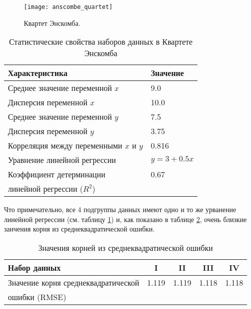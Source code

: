     \begin{figure}[!htp]
        \centering
        \texttt{[image: anscombe\_quartet]}
        \caption{Квартет Энскомба.}
        \label{pic:anscombe_quartet}
    \end{figure}

    \begin{table}[!htp]
    	\centering
    	\caption{Статистические свойства наборов данных в Квартете Энскомба}
		\begin{tabular}{|l|l|}
			\hline
			Характеристика                         & Значение   \\ \hline
			Среднее значение переменной $x$        & 9.0        \\ \hline
			Дисперсия переменной $x$               & 10.0       \\ \hline
			Среднее значение переменной $y$        & 7.5        \\ \hline
			Дисперсия переменной $y$               & 3.75       \\ \hline
			Корреляция между переменными $x$ и $y$ & 0.816      \\ \hline
			Уравнение линейной регрессии           & $y=3+0.5x$ \\ \hline
			Коэффициент детерминации               & 0.67       \\
			линейной регрессии ($R^2$)             &            \\ \hline
		\end{tabular}
		\label{table:anscombe_quartet_statistics}
	\end{table}

	Что примечательно, все 4 подгруппы данных имеют одно и то же урванение 
	линейной регрессии (см. таблицу \ref{table:anscombe_quartet_statistics}) и, 
	как показано в таблице \ref{table:anscombe_quartet_rmse}, очень близкие 
	занчения корня из среднеквадратической ошибки.

	\begin{table}[!htp]
    	\centering
    	\caption{Значения корней из среднеквадратической ошибки}
		\begin{tabular}{|l|c|c|c|c|}
			\hline
			Набор данных                        & I     & II    & III   & IV    \\ \hline
			Значение корня среднеквадратической & 1.119 & 1.119 & 1.118 & 1.118 \\ 
			ошибки (RMSE)                       &       &       &       &       \\ \hline
		\end{tabular}
		\label{table:anscombe_quartet_rmse}
	\end{table}

